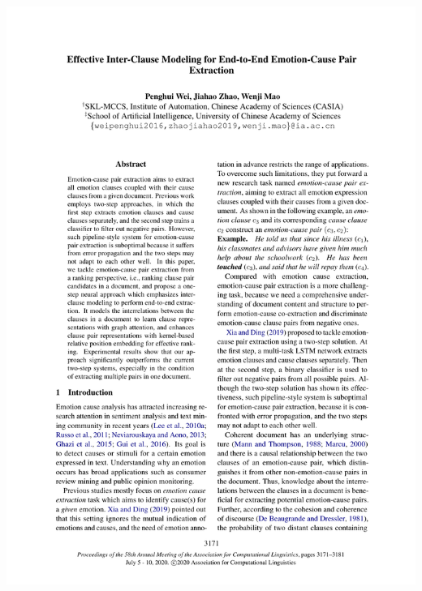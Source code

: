 {\centering
\includegraphics[width=\textwidth, page=1, trim = 15mm 30mm 15mm 20mm]{pdfs/ranking.pdf}
}
